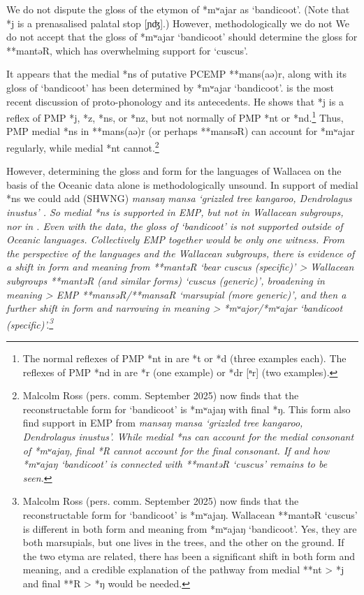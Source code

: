 We do not dispute the gloss of the  etymon of *mʷajar as ‘bandicoot’.
(Note that  *j is a prenasalised palatal stop [ɲʤ].)
However, methodologically we do not We do not accept
that the gloss of  *mʷajar ‘bandicoot’ should
determine the gloss for **mantəR,
which has overwhelming support for ‘cuscus’.

It appears that the medial *ns of putative PCEMP **mans(aə)r,
along with its gloss of ‘bandicoot’ has been determined by  *mʷajar ‘bandicoot’.
\citet[27--46]{ RossPawleyOsmond2023} is the most recent discussion
of  proto-phonology and its antecedents.
He shows that  *j is a reflex of PMP *j,
*z, *ns, or *nz, but not normally of PMP *nt or *nd.\footnote{
		The normal reflexes of PMP *nt in  are *t or *d (three examples each).
		The reflexes of PMP *nd in  are *r (one example) or
		*dr [ⁿr] (two examples).}
Thus, PMP medial *ns in **mans(aə)r (or perhaps **mansəR) can account
for  *mʷajar regularly,
while medial *nt cannot.\footnote{
  Malcolm Ross (pers. comm. September 2025) now finds that the
	reconstructable form for  ‘bandicoot’ is *mʷajaŋ with final *ŋ.
	This form also find support in EMP from 
	\it{mansaŋ} {\tl} \it{mansa} ‘grizzled tree kangaroo, \it{Dendrolagus inustus}’.
	While medial *ns can account for the medial consonant
	of  *mʷajaŋ, final *R cannot account for the final consonant.
	If and how  *mʷajaŋ `bandicoot' is connected with 
	**mantəR ‘cuscus’ remains to be seen.}

However, determining the gloss
and form for the languages of Wallacea on the basis
of the Oceanic data alone is methodologically unsound.
In support of medial *ns we could add  (SHWNG) \it{mansaŋ
{\tl} mansa} ‘grizzled tree kangaroo, \it{Dendrolagus inustus}’ \citep{Price2002}.
So medial *ns is supported in EMP,
but not in Wallacean subgroups, nor in .
Even with the  data,
the gloss of ‘bandicoot’ is not supported outside of Oceanic languages.
Collectively EMP together would be only one witness.
From the perspective of the  languages
and the Wallacean subgroups,
there is evidence of a shift in form
and meaning from  **mantəR ‘bear cuscus (specific)’
> Wallacean subgroups **mantəR (and similar forms) ‘cuscus (generic)’,
broadening in meaning > EMP **mansəR/**mansaR ‘marsupial (more
generic)’, and then a further shift in form
and narrowing in meaning >  *mʷajor/*mʷajar ‘bandicoot
(specific)’.\footnote{
		Malcolm Ross (pers. comm. September 2025) now finds that
		the reconstructable form for  ‘bandicoot’ is *mʷajaŋ.
		Wallacean **mantəR ‘cuscus’ is different
		in both form and meaning from  *mʷajaŋ ‘bandicoot’.
		Yes, they are both marsupials,
		but one lives in the trees,
		and the other on the ground.
		If the two etyma are related,
		there has been a significant shift in both form
		and meaning, and a credible explanation of the pathway from medial
		**nt >  *j and final **R >  *ŋ would be needed.}

